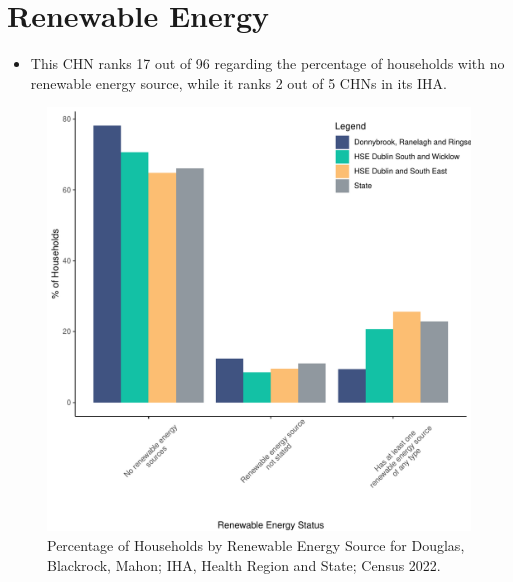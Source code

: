 \documentclass{article}
\begin{document}
\section{Renewable Energy}\label{sect:RE}
\begin{itemize}
\item This CHN ranks  17 out of 96 regarding the percentage of households with no renewable energy source, while it ranks   2 out of 5 CHNs in its IHA.
\end{itemize}
\begin{figure}[H]
	\centering
	\includegraphics[width = 140mm]{../figures/RenewableEnergyED.pdf}
	\caption{Percentage of Households by Renewable Energy Source for Douglas, Blackrock, Mahon; IHA, Health Region and State; Census 2022.}
	\label{fig:vbnv}
	\end{figure}
\end{document}
